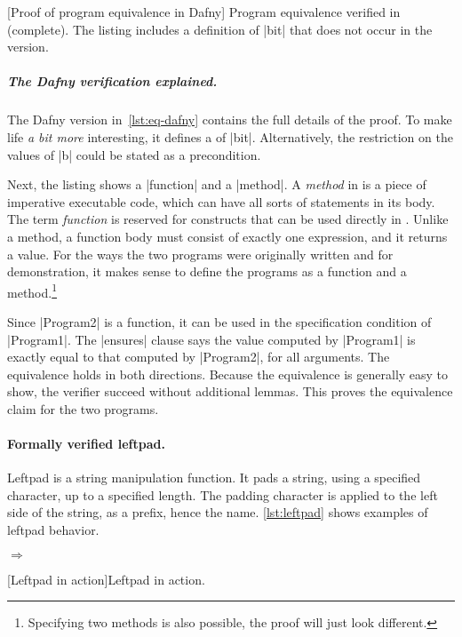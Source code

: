 \begin{center}
\begin{minipage}{\textwidth}
\captionsetup{type=lstlisting}
[Proof of program equivalence in Dafny]{
Program equivalence verified in  (complete). The listing includes a
 definition of \pr|bit| that does not occur in the 
version.}
\label{lst:eq-dafny}
\end{minipage}
\end{center}

\subparagraph*{The Dafny verification explained.}
The Dafny version in~\autoref{lst:eq-dafny} contains the full details of the
proof. To make life \textit{a bit more} interesting, it defines a 
of \pr|bit|. Alternatively, the restriction on the values of \pr|b| could be
stated as a precondition.

Next, the listing shows a \pr|function| and a \pr|method|. A \emph{method} in
 is a piece of imperative executable code, which can have all sorts
of statements in its body. The term \emph{function} is reserved for constructs
that can be used directly in . Unlike a method, a function
body must consist of exactly one expression, and it returns a value. For the
ways the two programs were originally written and for demonstration, it makes
sense to define the programs as a function and a method.\footnote{Specifying
two methods is also possible, the proof will just look different.}

Since \pr|Program2| is a function, it can be used in the specification condition
of \pr|Program1|. The \pr|ensures| clause says the value computed by
\pr|Program1| is exactly equal to that computed by \pr|Program2|, for all
arguments. The equivalence holds in both directions. Because the equivalence is
generally easy to show, the verifier succeed without additional lemmas. This
proves the equivalence claim for the two programs.

\paragraph{Formally verified leftpad.}
Leftpad is a string manipulation function. It pads a string, using a specified
character, up to a specified length. The padding character is applied to the
left side of the string, as a prefix, hence the name. \autoref{lst:leftpad}
shows examples of leftpad behavior.

\begin{center}
\captionsetup{type=lstlisting}
\begin{minipage}{\textwidth}
\begin{minipage}{.45\textwidth}
\end{minipage}%
\hfill\(\Rightarrow\)\hfill%
\begin{minipage}{.45\textwidth}
\end{minipage}
\end{minipage}
[Leftpad in action]{Leftpad in action.}
\label{lst:leftpad}
\end{center}

